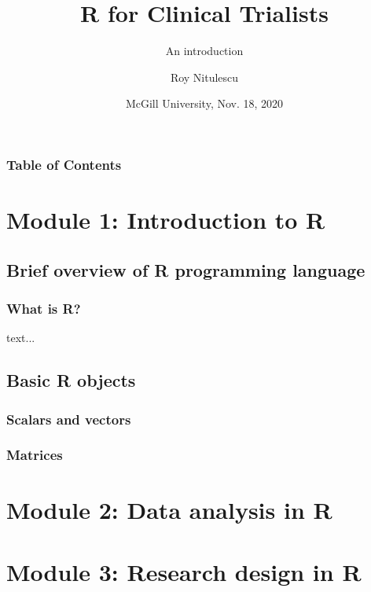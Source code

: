 \documentclass{beamer}
\title{R for Clinical Trialists}
\subtitle{An introduction}
\author{Roy Nitulescu\inst{1}}
\institute
{
    \inst{1}%
    CITADEL\\
    CR-CHUM
}
\date{McGill University, Nov. 18, 2020}
\begin{document}

\frame{\titlepage}

\begin{frame}
    \frametitle{Table of Contents}
    \tableofcontents
\end{frame}



\section{Module 1: Introduction to R}

\subsection{Brief overview of R programming language}

\begin{frame}
    \frametitle{What is R?}
    text...
\end{frame}

\subsection{Basic R objects}

\begin{frame}[fragile]
    \frametitle{Scalars and vectors}
    
\end{frame}

\begin{frame}[fragile]
    \frametitle{Matrices}
    
\end{frame}



\section{Module 2: Data analysis in R}




\section{Module 3: Research design in R}




\end{document}
